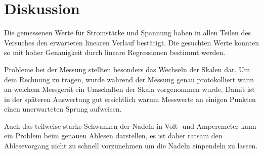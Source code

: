 \section{Diskussion}
\label{sec:Diskussion}

\noindent Die gemessenen Werte für Stromstärke und Spannung haben in allen Teilen des Versuches den erwarteten linearen Verlauf bestätigt.
Die gesuchten Werte konnten so mit hoher Genauigkeit durch lineare Regressionen bestimmt werden.

\noindent Probleme bei der Messung stellten besonders das Wechseln der Skalen dar.
Um dem Rechnung zu tragen, wurde während der Messung genau protokolliert wann an welchem Messgerät ein Umschalten der Skala vorgenommen wurde.
Damit ist in der späteren Auswertung gut ersichtlich warum Messwerte an einigen Punkten einen unerwarteten Sprung aufweisen.

\noindent Auch das teilweise starke Schwanken der Nadeln in Volt- und Amperemeter kann ein Problem beim genauen Ablesen darstellen, es ist daher ratsam den Ablesevorgang nicht zu schnell vorzunehmen um die Nadeln einpendeln zu lassen.
